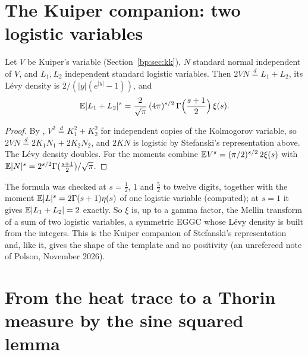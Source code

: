 \section{The Kuiper companion: two logistic variables}\label{riemanncont:sec:twologistic}

\begin{proposition}\label{riemanncont:prop:twologistic}
Let $V$ be Kuiper's variable (Section~\ref{bp:sec:kk}), $N$ standard normal independent of $V$, and $L_1,L_2$ independent standard logistic variables. Then $2VN\overset d=L_1+L_2$, its L\'evy density is $2/(|y|(e^{|y|}-1))$, and
\[
\mathbb{E}|L_1+L_2|^s=\frac2{\sqrt\pi}\,(4\pi)^{s/2}\,\Gamma\Big(\frac{s+1}2\Big)\,\xi(s).
\]
\end{proposition}

\begin{proof}
By \cite{BPY01}, $V^2\overset d=K_1^2+K_2^2$ for independent copies of the Kolmogorov variable, so $2VN\overset d=2K_1N_1+2K_2N_2$, and $2KN$ is logistic by Stefanski's representation above. The L\'evy density doubles. For the moments combine $\mathbb{E} V^s=(\pi/2)^{s/2}\,2\xi(s)$ with $\mathbb{E}|N|^s=2^{s/2}\Gamma(\frac{s+1}2)/\sqrt\pi$.
\end{proof}

The formula was checked at $s=\frac12$, $1$ and $\frac52$ to twelve digits, together with the moment $\mathbb{E}|L|^s=2\Gamma(s+1)\eta(s)$ of one logistic variable (computed); at $s=1$ it gives $\mathbb{E}|L_1+L_2|=2$ exactly. So $\xi$ is, up to a gamma factor, the Mellin transform of a sum of two logistic variables, a symmetric EGGC whose L\'evy density is built from the integers. This is the Kuiper companion of Stefanski's representation and, like it, gives the shape of the template and no positivity (an unrefereed note of Polson, November 2026).

\section{From the heat trace to a Thorin measure by the sine squared lemma}\label{riemanncont:sec:sin2}

